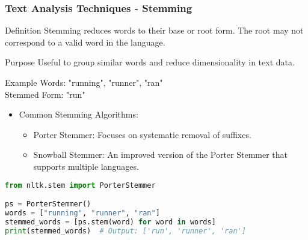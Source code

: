 \documentclass[aspectratio=169]{beamer}
\begin{document}
\begin{frame}[fragile]
    \frametitle{Text Analysis Techniques - Stemming}
    \begin{block}{Definition}
        Stemming reduces words to their base or root form. The root may not correspond to a valid word in the language.
    \end{block}
    
    \begin{block}{Purpose}
        Useful to group similar words and reduce dimensionality in text data.
    \end{block}

    \begin{exampleblock}{Example}
        Words: "running", "runner", "ran" \\
        Stemmed Form: "run"
    \end{exampleblock}

    \begin{itemize}
        \item Common Stemming Algorithms:
        \begin{itemize}
            \item Porter Stemmer: Focuses on systematic removal of suffixes.
            \item Snowball Stemmer: An improved version of the Porter Stemmer that supports multiple languages.
        \end{itemize}
    \end{itemize}

    \begin{lstlisting}[language=Python]
from nltk.stem import PorterStemmer

ps = PorterStemmer()
words = ["running", "runner", "ran"]
stemmed_words = [ps.stem(word) for word in words]
print(stemmed_words)  # Output: ['run', 'runner', 'ran']
    \end{lstlisting}
\end{frame}
\end{document}
